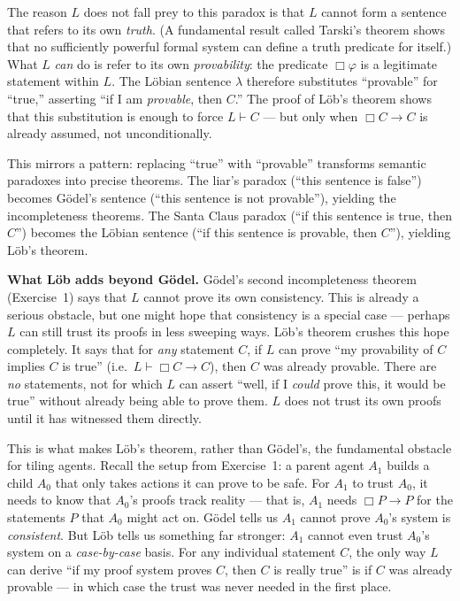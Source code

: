 \documentclass[11pt]{article}
\begin{document}
\begin{exercise}[L\"ob's theorem]
\medskip
\noindent
The reason $L$ does not fall prey to this paradox is that $L$ cannot form a sentence
that refers to its own \emph{truth}. (A fundamental result called Tarski's theorem
shows that no sufficiently powerful formal system can define a truth predicate for
itself.) What $L$ \emph{can} do is refer to its own \emph{provability}: the predicate
$\Box\varphi$ is a legitimate statement within $L$. The L\"obian sentence $\lambda$
therefore substitutes ``provable'' for ``true,'' asserting ``if I am \emph{provable},
then $C$.'' The proof of L\"ob's theorem shows that this substitution is enough to
force $L \vdash C$ --- but only when $\Box C \to C$ is already assumed, not
unconditionally.

\medskip
\noindent
This mirrors a pattern: replacing ``true'' with ``provable'' transforms semantic
paradoxes into precise theorems. The liar's paradox (``this sentence is false'')
becomes G\"odel's sentence (``this sentence is not provable''), yielding the
incompleteness theorems. The Santa Claus paradox (``if this sentence is true, then
$C$'') becomes the L\"obian sentence (``if this sentence is provable, then $C$''),
yielding L\"ob's theorem.

\medskip
\noindent
\textbf{What L\"ob adds beyond G\"odel.} G\"odel's second incompleteness theorem
(Exercise~1) says that $L$ cannot prove its own consistency. This is already a
serious obstacle, but one might hope that consistency is a special case --- perhaps
$L$ can still trust its proofs in less sweeping ways. L\"ob's theorem crushes this
hope completely. It says that for \emph{any} statement $C$, if $L$ can prove ``my
provability of $C$ implies $C$ is true'' (i.e.\ $L \vdash \Box C \to C$), then $C$
was already provable. There are \emph{no} statements, not for which $L$ can assert ``well, if I \emph{could} prove this, it would be
true'' without already being able to prove them. $L$ does not trust its own proofs
until it has witnessed them directly.

\medskip
\noindent
This is what makes L\"ob's theorem, rather than G\"odel's, the fundamental obstacle
for tiling agents. Recall the setup from Exercise~1: a parent agent $A_1$ builds a
child $A_0$ that only takes actions it can prove to be safe. For $A_1$ to trust
$A_0$, it needs to know that $A_0$'s proofs track reality --- that is, $A_1$ needs
$\Box P \to P$ for the statements $P$ that $A_0$ might act on. G\"odel tells us
$A_1$ cannot prove $A_0$'s system is \emph{consistent}. But L\"ob tells us something
far stronger: $A_1$ cannot even trust $A_0$'s system on a \emph{case-by-case} basis.
For any individual statement $C$, the only way $L$ can derive ``if my proof system
proves $C$, then $C$ is really true'' is if $C$ was already provable --- in which
case the trust was never needed in the first place.


\end{exercise}
\end{document}
